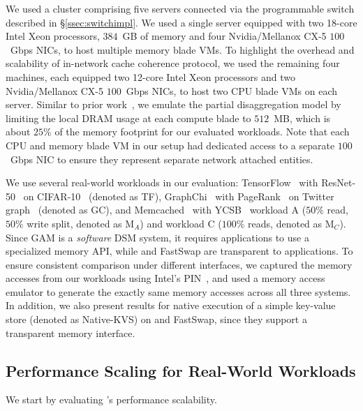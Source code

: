  We used a cluster comprising five servers connected via the programmable switch described in \S\ref{ssec:switchimpl}. We used a single server equipped with two 18-core Intel Xeon processors, $384$~GB of memory and four Nvidia/Mellanox CX-5 $100$~Gbps NICs, to host multiple memory blade VMs. To highlight the overhead and scalability of in-network cache coherence protocol, we used the remaining four machines, each equipped two 12-core Intel Xeon processors and two Nvidia/Mellanox CX-5 $100$~Gbps NICs, to host two CPU blade VMs on each server. Similar to prior work~\cite{legoos}, we emulate the partial disaggregation model by limiting the local DRAM usage at each compute blade to $512$~MB, which is about $25\%$ of the memory footprint for our evaluated workloads. Note that each CPU and memory blade VM in our setup had dedicated access to a separate $100$~Gbps NIC to ensure they represent separate network attached entities.

 We use several real-world workloads in our evaluation: TensorFlow~\cite{tensorflow} with ResNet-50~\cite{resnet} on CIFAR-10~\cite{cifar10} (denoted as TF), GraphChi~\cite{graphchi} with PageRank~\cite{pagerank} on Twitter graph~\cite{twitter_graph} (denoted as GC), and Memcached~\cite{memcached} with YCSB~\cite{ycsb_workload} workload A ($50\%$ read, $50\%$ write split, denoted as M$_A$) and workload C ($100\%$ reads, denoted as M$_C$). Since GAM is a \textit{software} DSM system, it requires applications to use a specialized memory API, while \mind and FastSwap are transparent to applications. To ensure consistent comparison under different interfaces, we captured the memory accesses from our workloads using Intel's PIN~\cite{intel_pin}, and used a memory access emulator to generate the exactly same memory accesses across all three systems. In addition, we also present results for native execution of a simple key-value store (denoted as Native-KVS) on \mind and FastSwap, since they support a transparent memory interface.

\subsection{Performance Scaling for Real-World Workloads}\label{subsec:macro_bench}

We start by evaluating \mind's performance scalability.

